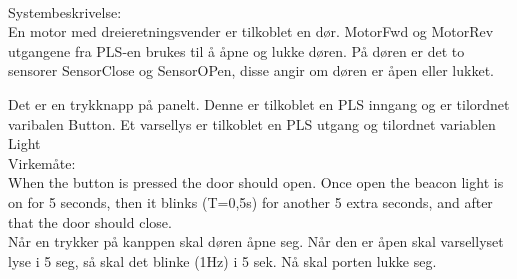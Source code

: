 

\\[1cm]
Systembeskrivelse:\\
En motor med dreieretningsvender er tilkoblet en dør. MotorFwd og MotorRev utgangene fra PLS-en brukes til å åpne og lukke døren. På døren er det to sensorer SensorClose og SensorOPen, disse angir om døren er åpen eller lukket. 

Det er en trykknapp på panelt. Denne er tilkoblet en PLS inngang og er tilordnet varibalen Button. Et varsellys er tilkoblet en PLS utgang og tilordnet variablen Light\\[2cm]

Virkemåte:\\[1cm]

When the button is pressed the door should open. Once open the beacon light is on for 5 seconds, then it blinks (T=0,5s) for another 5 extra seconds, and after that the door should close.\\
Når en trykker på kanppen skal døren åpne seg. Når den er åpen skal varsellyset lyse i 5 seg, så skal det blinke (1Hz) i 5 sek. Nå skal porten lukke seg.




















